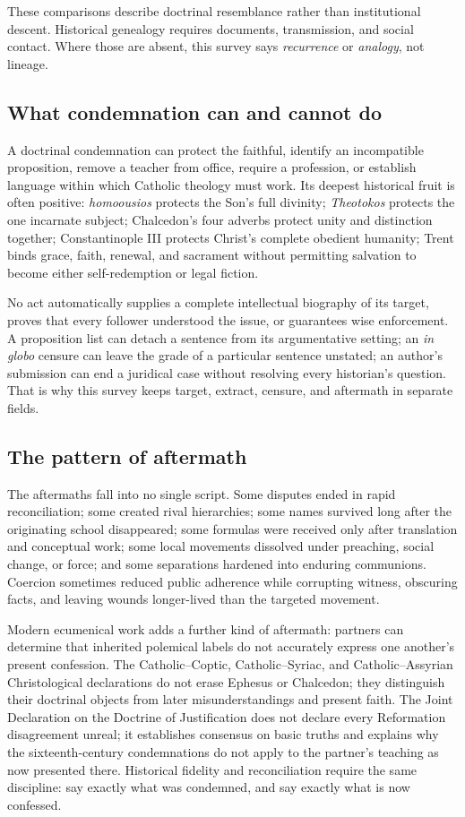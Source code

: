 These comparisons describe doctrinal resemblance rather than institutional descent. Historical genealogy requires documents, transmission, and social contact. Where those are absent, this survey says \emph{recurrence} or \emph{analogy}, not lineage.

\subsection{What condemnation can and cannot do}

A doctrinal condemnation can protect the faithful, identify an incompatible proposition, remove a teacher from office, require a profession, or establish language within which Catholic theology must work. Its deepest historical fruit is often positive: \emph{homoousios} protects the Son's full divinity; \emph{Theotokos} protects the one incarnate subject; Chalcedon's four adverbs protect unity and distinction together; Constantinople III protects Christ's complete obedient humanity; Trent binds grace, faith, renewal, and sacrament without permitting salvation to become either self-redemption or legal fiction.

No act automatically supplies a complete intellectual biography of its target, proves that every follower understood the issue, or guarantees wise enforcement. A proposition list can detach a sentence from its argumentative setting; an \emph{in globo} censure can leave the grade of a particular sentence unstated; an author's submission can end a juridical case without resolving every historian's question. That is why this survey keeps target, extract, censure, and aftermath in separate fields.

\subsection{The pattern of aftermath}

The aftermaths fall into no single script. Some disputes ended in rapid reconciliation; some created rival hierarchies; some names survived long after the originating school disappeared; some formulas were received only after translation and conceptual work; some local movements dissolved under preaching, social change, or force; and some separations hardened into enduring communions. Coercion sometimes reduced public adherence while corrupting witness, obscuring facts, and leaving wounds longer-lived than the targeted movement.

Modern ecumenical work adds a further kind of aftermath: partners can determine that inherited polemical labels do not accurately express one another's present confession. The Catholic–Coptic, Catholic–Syriac, and Catholic–Assyrian Christological declarations do not erase Ephesus or Chalcedon; they distinguish their doctrinal objects from later misunderstandings and present faith. The Joint Declaration on the Doctrine of Justification does not declare every Reformation disagreement unreal; it establishes consensus on basic truths and explains why the sixteenth-century condemnations do not apply to the partner's teaching as now presented there. Historical fidelity and reconciliation require the same discipline: say exactly what was condemned, and say exactly what is now confessed.


